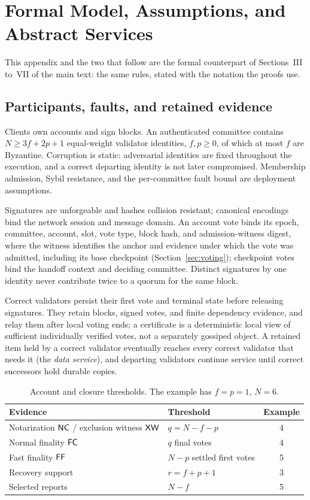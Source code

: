 \section{Formal Model, Assumptions, and Abstract Services}
\label{sec:model}
This appendix and the two that follow are the formal counterpart of Sections~III to~VII of the main text: the same rules, stated with the notation the proofs use.
\subsection{Participants, faults, and retained evidence}
Clients own accounts and sign blocks. An authenticated committee contains $N\ge3f+2p+1$ equal-weight validator identities, $f,p\geq0$, of which at most $f$ are Byzantine. Corruption is static: adversarial identities are fixed throughout the execution, and a correct departing identity is not later compromised. Membership admission, Sybil resistance, and the per-committee fault bound are deployment assumptions.

Signatures are unforgeable and hashes collision resistant; canonical encodings bind the network session and message domain. An account vote binds its epoch, committee, account, slot, vote type, block hash, and admission-witness digest, where the witness identifies the anchor and evidence under which the vote was admitted, including its base checkpoint (Section~\ref{sec:voting}); checkpoint votes bind the handoff context and deciding committee. Distinct signatures by one identity never contribute twice to a quorum for the same block.

Correct validators persist their first vote and terminal state before releasing signatures. They retain blocks, signed votes, and finite dependency evidence, and relay them after local voting ends; a certificate is a deterministic local view of sufficient individually verified votes, not a separately gossiped object. A retained item held by a correct validator eventually reaches every correct validator that needs it (the \emph{data service}), and departing validators continue service until correct successors hold durable copies.

\begin{table}[t]
\caption{Account and closure thresholds. The example has $f=p=1$, $N=6$.}
\label{tab:thresholds}
\centering
\begin{tabularx}{\columnwidth}{@{}Ylc@{}}
\toprule
Evidence & Threshold & Example\\
\midrule
Notarization $\mathsf{NC}$ / exclusion witness $\mathsf{XW}$ & $q=N-f-p$ & 4\\
Normal finality $\mathsf{FC}$ & $q$ final votes & 4\\
Fast finality $\mathsf{FF}$ & $N-p$ settled first votes & 5\\
Recovery support & $r=f+p+1$ & 3\\
Selected reports & $N-f$ & 5\\
\bottomrule
\end{tabularx}
\end{table}


